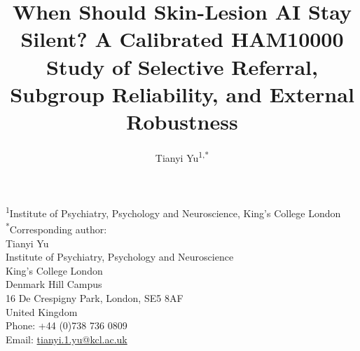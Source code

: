 \documentclass[11pt,a4paper]{article}
\title{When Should Skin-Lesion AI Stay Silent? A Calibrated HAM10000 Study of Selective Referral, Subgroup Reliability, and External Robustness}
\author{Tianyi Yu\textsuperscript{1,*}}
\date{}
\begin{document}
\maketitle

\noindent\textsuperscript{1}Institute of Psychiatry, Psychology and Neuroscience, King's College London \\
\noindent\textsuperscript{*}Corresponding author: \\
Tianyi Yu\\
Institute of Psychiatry, Psychology and Neuroscience\\
King's College London\\
Denmark Hill Campus\\
16 De Crespigny Park, London, SE5 8AF \\
United Kingdom \\
Phone: +44 (0)738 736 0809 \\
Email: \href{mailto:tianyi.1.yu@kcl.ac.uk}{tianyi.1.yu@kcl.ac.uk}

\vspace{1em}

\date{}
\end{document}
